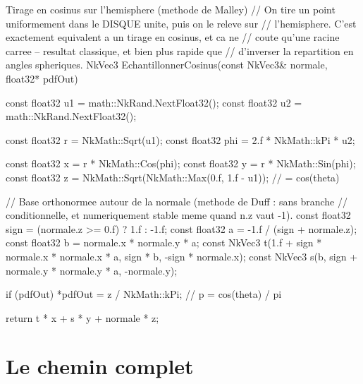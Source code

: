 \begin{nkcode}{Tirage en cosinus sur l'hemisphere (methode de Malley)}
// On tire un point uniformement dans le DISQUE unite, puis on le releve sur
// l'hemisphere. C'est exactement equivalent a un tirage en cosinus, et ca ne
// coute qu'une racine carree -- resultat classique, et bien plus rapide que
// d'inverser la repartition en angles spheriques.
NkVec3 EchantillonnerCosinus(const NkVec3& normale, float32* pdfOut) {
    const float32 u1 = math::NkRand.NextFloat32();
    const float32 u2 = math::NkRand.NextFloat32();

    const float32 r = NkMath::Sqrt(u1);
    const float32 phi = 2.f * NkMath::kPi * u2;

    const float32 x = r * NkMath::Cos(phi);
    const float32 y = r * NkMath::Sin(phi);
    const float32 z = NkMath::Sqrt(NkMath::Max(0.f, 1.f - u1));  // = cos(theta)

    // Base orthonormee autour de la normale (methode de Duff : sans branche
    // conditionnelle, et numeriquement stable meme quand n.z vaut -1).
    const float32 sign = (normale.z >= 0.f) ? 1.f : -1.f;
    const float32 a = -1.f / (sign + normale.z);
    const float32 b = normale.x * normale.y * a;
    const NkVec3 t(1.f + sign * normale.x * normale.x * a, sign * b, -sign * normale.x);
    const NkVec3 s(b, sign + normale.y * normale.y * a, -normale.y);

    if (pdfOut)
        *pdfOut = z / NkMath::kPi;          // p = cos(theta) / pi

    return t * x + s * y + normale * z;
}
\end{nkcode}

\section{Le chemin complet}

